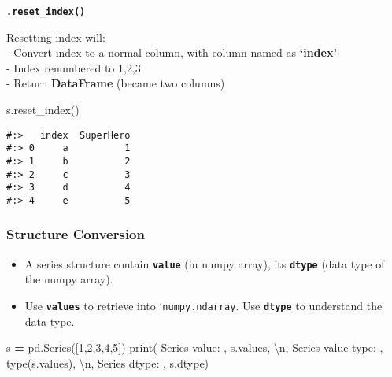 \documentclass[
]{book}
\newenvironment{Shaded}{\begin{snugshade}}{\end{snugshade}}
\newcommand{\BuiltInTok}[1]{#1}
\newcommand{\CharTok}[1]{\textcolor[rgb]{0.5,0.5,0.5}{#1}}
\newcommand{\DecValTok}[1]{\textcolor[rgb]{0.06,0.06,0.06}{#1}}
\newcommand{\NormalTok}[1]{#1}
\newcommand{\OperatorTok}[1]{\textcolor[rgb]{0.43,0.43,0.43}{\textbf{#1}}}
\newcommand{\StringTok}[1]{\textcolor[rgb]{0.5,0.5,0.5}{#1}}
\providecommand{\tightlist}{%
  \setlength{\itemsep}{0pt}\setlength{\parskip}{0pt}}
\begin{document}
\textbf{\texttt{.reset\_index()}}

Resetting index will:\\
- Convert index to a normal column, with column named as \textbf{`index'}\\
- Index renumbered to 1,2,3\\
- Return \textbf{DataFrame} (became two columns)

\begin{Shaded}
\begin{Highlighting}[]
\NormalTok{s.reset\_index()}
\end{Highlighting}
\end{Shaded}

\begin{verbatim}
#:>   index  SuperHero
#:> 0     a          1
#:> 1     b          2
#:> 2     c          3
#:> 3     d          4
#:> 4     e          5
\end{verbatim}

\hypertarget{structure-conversion-1}{%
\subsubsection{Structure Conversion}\label{structure-conversion-1}}

\begin{itemize}
\tightlist
\item
  A series structure contain \textbf{\texttt{value}} (in numpy array), its \textbf{\texttt{dtype}} (data type of the numpy array).\\
\item
  Use \textbf{\texttt{values}} to retrieve into `\texttt{numpy.ndarray}. Use \textbf{\texttt{dtype}} to understand the data type.
\end{itemize}

\begin{Shaded}
\begin{Highlighting}[]
\NormalTok{s }\OperatorTok{=}\NormalTok{ pd.Series([}\DecValTok{1}\NormalTok{,}\DecValTok{2}\NormalTok{,}\DecValTok{3}\NormalTok{,}\DecValTok{4}\NormalTok{,}\DecValTok{5}\NormalTok{])}
\BuiltInTok{print}\NormalTok{(}\StringTok{\textquotesingle{} Series value:      \textquotesingle{}}\NormalTok{, s.values, }\StringTok{\textquotesingle{}}\CharTok{\textbackslash{}n}\StringTok{\textquotesingle{}}\NormalTok{, }
      \StringTok{\textquotesingle{}Series value type: \textquotesingle{}}\NormalTok{,  }\BuiltInTok{type}\NormalTok{(s.values), }\StringTok{\textquotesingle{}}\CharTok{\textbackslash{}n}\StringTok{\textquotesingle{}}\NormalTok{,}
      \StringTok{\textquotesingle{}Series dtype:      \textquotesingle{}}\NormalTok{,  s.dtype)}
\end{Highlighting}
\end{Shaded}
\end{document}

